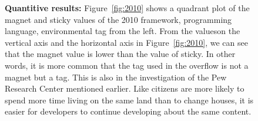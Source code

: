 \documentclass[conference]{IEEEtran}
\begin{document}
\begin{figure}[t]


\textbf{Quantitive results:}
Figure~\ref{fig:2010} shows a quadrant plot of the magnet and sticky values ​​of the 2010 framework, programming language, environmental tag from the left. From the values ​​on the vertical axis and the horizontal axis in Figure~\ref{fig:2010}, we can see that the magnet value is lower than the value of sticky. In other words, it is more common that the tag used in the overflow is not a magnet but a tag. This is also in the investigation of the Pew Research Center mentioned earlier. Like citizens are more likely to spend more time living on the same land than to change houses,  it is easier for developers to continue developing about the same content.
\smallskip
%   

\begin{oframed}


\end{oframed}
\end{figure}
\end{document}
